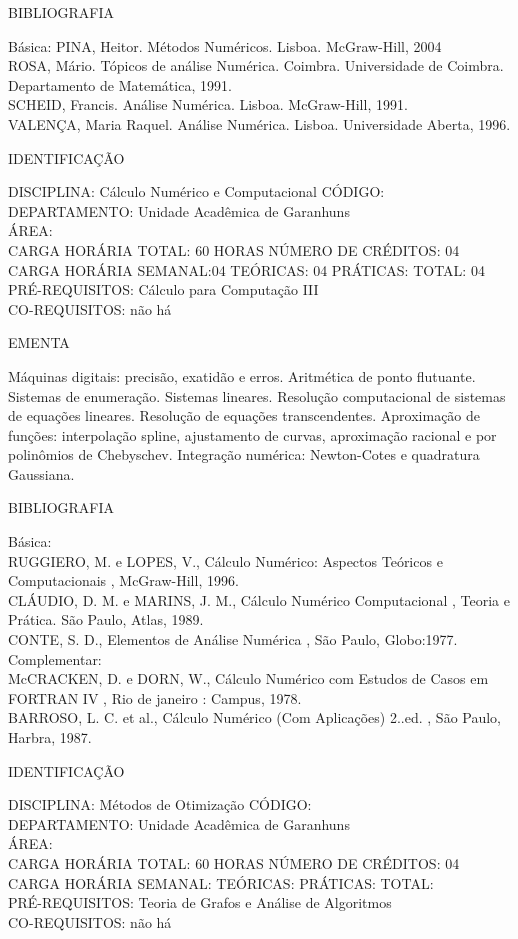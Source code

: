 \documentclass[
	12pt,				%
	openright,			%
  oneside,     %
	a4paper,			%
	chapter=TITLE,		%
	english,			%
	french,				%
	spanish,			%
	brazil				%
	]{abntex2}
\begin{document}
\begin{apendicesenv}
BIBLIOGRAFIA 

Básica:
PINA, Heitor. Métodos Numéricos. Lisboa. McGraw-Hill, 2004\\
ROSA, Mário. Tópicos de análise Numérica. Coimbra. Universidade de Coimbra.
Departamento de Matemática, 1991.\\
SCHEID, Francis. Análise Numérica. Lisboa. McGraw-Hill, 1991.\\
VALENÇA, Maria Raquel. Análise Numérica. Lisboa. Universidade Aberta, 1996.

\newpage IDENTIFICAÇÃO

DISCIPLINA: Cálculo Numérico e Computacional CÓDIGO:\\
DEPARTAMENTO: Unidade Acadêmica de Garanhuns\\ 
ÁREA:\\
CARGA HORÁRIA TOTAL: 60 HORAS NÚMERO DE CRÉDITOS: 04\\
CARGA HORÁRIA SEMANAL:04 TEÓRICAS: 04 PRÁTICAS: TOTAL: 04\\
PRÉ-REQUISITOS: Cálculo para Computação III\\
CO-REQUISITOS: não há

EMENTA 

Máquinas digitais: precisão, exatidão e erros. Aritmética de ponto
flutuante. Sistemas de enumeração. Sistemas lineares. Resolução
computacional de sistemas de equações lineares. Resolução de equações
transcendentes. Aproximação de funções: interpolação spline,
ajustamento de curvas, aproximação racional e por polinômios de
Chebyschev. Integração numérica: Newton-Cotes e quadratura Gaussiana.

BIBLIOGRAFIA 

Básica:\\
RUGGIERO, M. e LOPES, V.,  Cálculo Numérico: Aspectos
Teóricos e Computacionais , McGraw-Hill, 1996.\\
CLÁUDIO, D. M. e MARINS, J. M.,  Cálculo Numérico
Computacional , Teoria e Prática. São Paulo, Atlas,
1989.\\
CONTE, S. D.,  Elementos de Análise
Numérica , São Paulo, Globo:1977.\\
Complementar:\\
McCRACKEN, D. e DORN, W.,  Cálculo Numérico com
Estudos de Casos em FORTRAN IV , Rio de janeiro :
Campus, 1978.\\
BARROSO, L. C. et al.,  Cálculo Numérico (Com
Aplicações) 2..ed. , São Paulo, Harbra, 1987.

\newpage IDENTIFICAÇÃO

DISCIPLINA: Métodos de Otimização CÓDIGO:\\
DEPARTAMENTO: Unidade Acadêmica de Garanhuns\\
ÁREA: \\
CARGA HORÁRIA TOTAL: 60 HORAS NÚMERO DE CRÉDITOS: 04\\
CARGA HORÁRIA SEMANAL: TEÓRICAS: PRÁTICAS: TOTAL: \\
PRÉ-REQUISITOS: Teoria de Grafos e Análise de Algoritmos\\
CO-REQUISITOS: não há


\end{apendicesenv}
\end{document}
